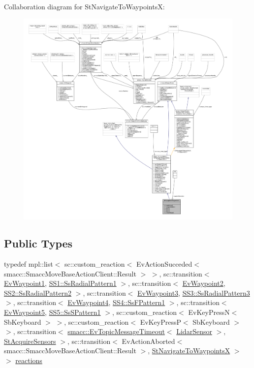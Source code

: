 Collaboration diagram for St\+Navigate\+To\+WaypointsX\+:
\nopagebreak
\begin{figure}[H]
\begin{center}
\leavevmode
\includegraphics[width=350pt]{structStNavigateToWaypointsX__coll__graph}
\end{center}
\end{figure}
\subsection*{Public Types}
\begin{DoxyCompactItemize}
\item 
typedef mpl\+::list$<$ sc\+::custom\+\_\+reaction$<$ Ev\+Action\+Succeded$<$ smacc\+::\+Smacc\+Move\+Base\+Action\+Client\+::\+Result $>$ $>$, sc\+::transition$<$ \hyperlink{structEvWaypoint1}{Ev\+Waypoint1}, \hyperlink{structSS1_1_1SsRadialPattern1}{S\+S1\+::\+Ss\+Radial\+Pattern1} $>$, sc\+::transition$<$ \hyperlink{structEvWaypoint2}{Ev\+Waypoint2}, \hyperlink{structSS2_1_1SsRadialPattern2}{S\+S2\+::\+Ss\+Radial\+Pattern2} $>$, sc\+::transition$<$ \hyperlink{structEvWaypoint3}{Ev\+Waypoint3}, \hyperlink{structSS3_1_1SsRadialPattern3}{S\+S3\+::\+Ss\+Radial\+Pattern3} $>$, sc\+::transition$<$ \hyperlink{structEvWaypoint4}{Ev\+Waypoint4}, \hyperlink{structSS4_1_1SsFPattern1}{S\+S4\+::\+Ss\+F\+Pattern1} $>$, sc\+::transition$<$ \hyperlink{structEvWaypoint5}{Ev\+Waypoint5}, \hyperlink{structSS5_1_1SsSPattern1}{S\+S5\+::\+Ss\+S\+Pattern1} $>$, sc\+::custom\+\_\+reaction$<$ Ev\+Key\+PressN$<$ Sb\+Keyboard $>$ $>$, sc\+::custom\+\_\+reaction$<$ Ev\+Key\+PressP$<$ Sb\+Keyboard $>$ $>$, sc\+::transition$<$ \hyperlink{structsmacc_1_1EvTopicMessageTimeout}{smacc\+::\+Ev\+Topic\+Message\+Timeout}$<$ \hyperlink{sensor__state_8h_a9db9e1944f88de79507758d08e4a2ee3}{Lidar\+Sensor} $>$, \hyperlink{structStAcquireSensors}{St\+Acquire\+Sensors} $>$, sc\+::transition$<$ Ev\+Action\+Aborted$<$ smacc\+::\+Smacc\+Move\+Base\+Action\+Client\+::\+Result $>$, \hyperlink{structStNavigateToWaypointsX}{St\+Navigate\+To\+WaypointsX} $>$ $>$ \hyperlink{structStNavigateToWaypointsX_aae86dda0e861431b69ef8372613f5509}{reactions}
\end{DoxyCompactItemize}

